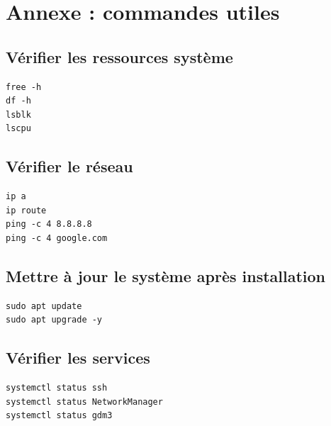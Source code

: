 \documentclass[12pt,a4paper]{article}
\begin{document}
\section{Annexe : commandes utiles}

\subsection*{Vérifier les ressources système}

\begin{lstlisting}
free -h
df -h
lsblk
lscpu
\end{lstlisting}

\subsection*{Vérifier le réseau}

\begin{lstlisting}
ip a
ip route
ping -c 4 8.8.8.8
ping -c 4 google.com
\end{lstlisting}

\subsection*{Mettre à jour le système après installation}

\begin{lstlisting}
sudo apt update
sudo apt upgrade -y
\end{lstlisting}

\subsection*{Vérifier les services}

\begin{lstlisting}
systemctl status ssh
systemctl status NetworkManager
systemctl status gdm3
\end{lstlisting}
\end{document}
